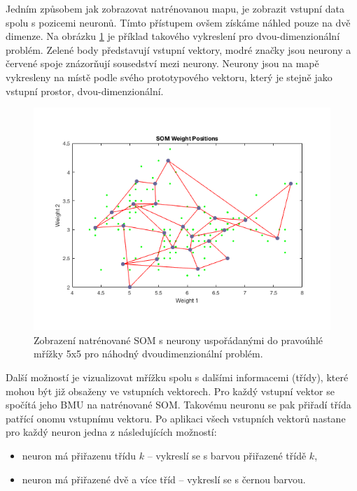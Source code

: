 \documentclass[thesis=M,czech]{FITthesis}[2012/06/26]
\begin{document}
Jedním způsobem jak zobrazovat natrénovanou mapu, je zobrazit vstupní data spolu s pozicemi neuronů. Tímto přístupem ovšem získáme náhled pouze na dvě dimenze. Na obrázku \ref{fig:plotsompos} je příklad takového vykreslení pro dvou-dimenzionální problém. Zelené body představují vstupní vektory, modré značky jsou neurony a červené spoje znázorňují sousedství mezi neurony. Neurony jsou na mapě vykresleny na místě podle svého prototypového vektoru, který je stejně jako vstupní prostor, dvou-dimenzionální.



\begin{figure}[htbp]
\begin{center}
	\includegraphics[scale=0.5]{iris_plotsompos.png}
\caption{Zobrazení natrénované SOM s neurony uspořádanými do pravoúhlé mřížky 5x5 pro náhodný dvoudimenzionální problém.}
\label{fig:plotsompos}
\end{center}
\end{figure}


Další možností je vizualizovat mřížku spolu s dalšími informacemi (třídy), které mohou být již obsaženy ve vstupních vektorech. Pro každý vstupní vektor se spočítá jeho BMU na natrénované SOM. Takovému neuronu se pak přiřadí třída patřící onomu vstupnímu vektoru. Po aplikaci všech vstupních vektorů nastane pro každý neuron jedna z následujících možností:

\begin{itemize}
\item neuron má přiřazenu třídu $k$ -- vykreslí se s barvou přiřazené třídě $k$,
\item  neuron má přiřazené dvě a více tříd -- vykreslí se s černou barvou.
\end{itemize}
 
\end{document}
